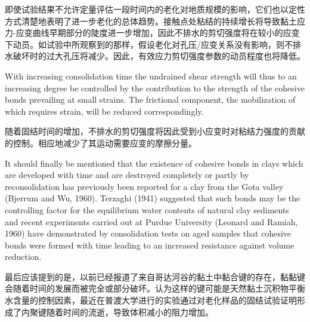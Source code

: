 \begin{paracol}{2}
    \switchcolumn
   
    即使试验结果不允许定量评估一段时间内的老化对地质规模的影响，它们也以定性方式清楚地表明了进一步老化的总体趋势。接触点处粘结的持续增长将导致黏土应力-应变曲线早期部分的陡度进一步增加，因此不排水的剪切强度将在较小的应变下动员。如试验中所观察到的那样，假设老化对孔压/应变关系没有影响，则不排水破坏时的过大孔压将减少。因此，有效应力剪切强度参数的动员程度也将降低。

    \switchcolumn*
    
    With increasing consolidation time the undrained shear strength will thus to an increasing degree be controlled by the contribution to the strength of the cohesive bonds prevailing at small strains. The frictional component, the mobilization of which requires strain, will be reduced correspondingly.

    \switchcolumn
   
    随着固结时间的增加，不排水的剪切强度将因此受到小应变时对粘结力强度的贡献的控制。相应地减少了其运动需要应变的摩擦分量。

    \switchcolumn*
    
    It should finally be mentioned that the existence of cohesive bonds in clays which are developed with time and are destroyed completely or partly by reconsolidation has previously been reported for a clay from the Gota valley (Bjerrum and Wu, 1960). Terzaghi (1941) suggested that such bonds may be the controlling factor for the equilibrium water contents of natural clay sediments and recent experiments carried out at Purdue University (Leonard and Ramiah, 1960) have demonstrated by consolidation tests on aged samples that cohesive bonds were formed with time leading to an increased resistance against volume reduction.

    \switchcolumn
   
    最后应该提到的是，以前已经报道了来自哥达河谷的黏土中黏合键的存在，黏黏键会随着时间的发展而被完全或部分破坏\citep{Bjerrum1960109}。\citet{Terzaghi1941211}认为这样的键可能是天然黏土沉积物平衡水含量的控制因素，最近在普渡大学进行的实验\citep{Leonards1960116}通过对老化样品的固结试验证明形成了内聚键随着时间的流逝，导致体积减小的阻力增加。

\end{paracol}